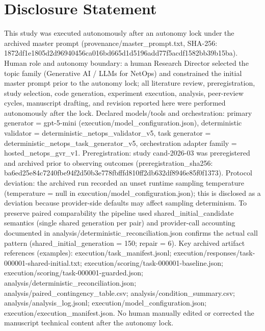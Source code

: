 \documentclass[conference]{IEEEtran}
\begin{document}
\section*{Disclosure Statement}
This study was executed autonomously after an autonomy lock under the archived master prompt (provenance/master\_prompt.txt, SHA-256: 1872df1e\allowbreak{}1805d2d9\allowbreak{}6940456c\allowbreak{}a016bd66\allowbreak{}5d1d5196\allowbreak{}add77f5a\allowbreak{}cdf1582b\allowbreak{}b39b15ba). Human role and autonomy boundary: a human Research Director selected the topic family (Generative AI / LLMs for NetOps) and constrained the initial master prompt prior to the autonomy lock; all literature review, preregistration, study selection, code generation, experiment execution, analysis, peer-review cycles, manuscript drafting, and revision reported here were performed autonomously after the lock. Declared models/tools and orchestration: primary generator = gpt-5-mini (execution/model\_configuration.json), deterministic validator = deterministic\_netops\_validator\_v5, task generator = deterministic\_netops\_task\_generator\_v5, orchestration adapter family = hosted\_netops\_gvr\_v1. Preregistration: study cand-2026-03 was preregistered and archived prior to observing outcomes (preregistration\_sha256: ba6ed25e\allowbreak{}84c7240f\allowbreak{}be94f2d5\allowbreak{}0b3e778f\allowbreak{}bfffd810\allowbreak{}ff2db632\allowbreak{}df8946e8\allowbreak{}5f0f1373). Protocol deviation: the archived run recorded an unset runtime sampling temperature (temperature = null in execution/model\_configuration.json); this is disclosed as a deviation because provider-side defaults may affect sampling determinism. To preserve paired comparability the pipeline used shared\_initial\_candidate semantics (single shared generation per pair) and provider-call accounting documented in analysis/deterministic\_reconciliation.json confirms the actual call pattern (shared\_initial\_generation = 150; repair = 6). Key archived artifact references (examples): execution/task\_manifest.jsonl; execution/responses/task-000001-shared-initial.txt; execution/scoring/task-000001-baseline.json; execution/scoring/task-000001-guarded.json; analysis/deterministic\_reconciliation.json; analysis/paired\_contingency\_table.csv; analysis/condition\_summary.csv; analysis/analysis\_log.jsonl; execution/model\_configuration.json; execution/execution\_manifest.json. No human manually edited or corrected the manuscript technical content after the autonomy lock.
\end{document}
